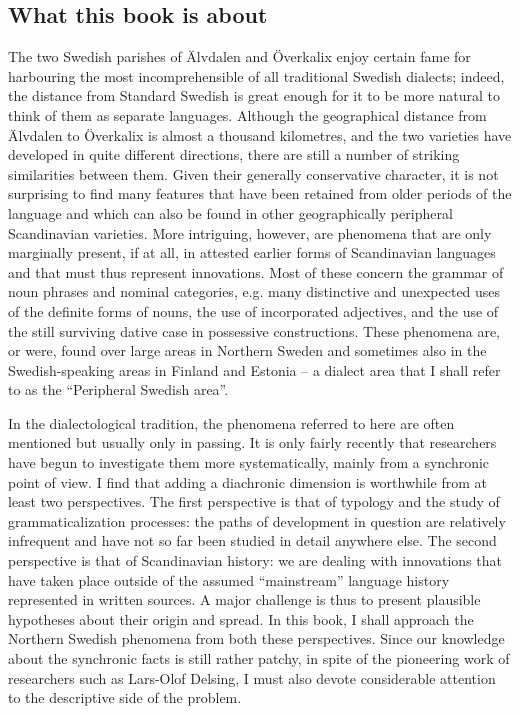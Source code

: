\subsection[What this book is about]{\rmfamily What this book is about}
The two Swedish parishes of Älvdalen and Överkalix enjoy certain fame for harbouring the most incomprehensible of all traditional Swedish dialects; indeed, the distance from Standard Swedish is great enough for it to be more natural to think of them as separate languages. Although the geographical distance from Älvdalen to Överkalix is almost a thousand kilometres, and the two varieties have developed in quite different directions, there are still a number of striking similarities between them. Given their generally conservative character, it is not surprising to find many features that have been retained from older periods of the language and which can also be found in other geographically peripheral Scandinavian varieties. More intriguing, however, are phenomena that are only marginally present, if at all, in attested earlier forms of Scandinavian languages and that must thus represent innovations. Most of these concern the grammar of noun phrases and nominal categories, e.g. many distinctive and unexpected uses of the definite forms of nouns, the use of incorporated adjectives, and the use of the still surviving dative case in possessive constructions. These phenomena are, or were, found over large areas in Northern Sweden and sometimes also in the Swedish-speaking areas in Finland and Estonia – a dialect area that I shall refer to as the “Peripheral Swedish area”.

In the dialectological tradition, the phenomena referred to here are often mentioned but usually only in passing. It is only fairly recently that researchers have begun to investigate them more systematically, mainly from a synchronic point of view. I find that adding a diachronic dimension is worthwhile from at least two perspectives. The first perspective is that of typology and the study of grammaticalization processes: the paths of development in question are relatively infrequent and have not so far been studied in detail anywhere else. The second perspective is that of Scandinavian history: we are dealing with innovations that have taken place outside of the assumed “mainstream” language history represented in written sources. A major challenge is thus to present plausible hypotheses about their origin and spread. In this book, I shall approach the Northern Swedish phenomena from both these perspectives. Since our knowledge about the synchronic facts is still rather patchy, in spite of the pioneering work of researchers such as Lars-Olof Delsing, I must also devote considerable attention to the descriptive side of the problem.

